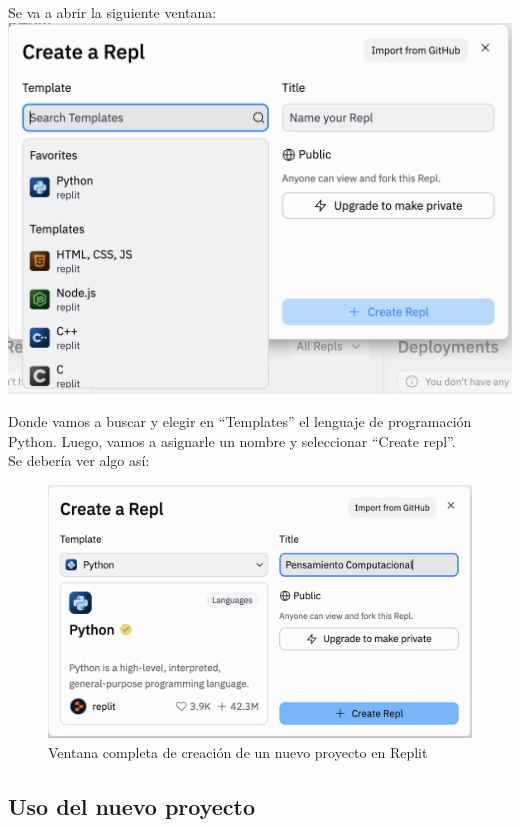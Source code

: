\documentclass[
  letterpaper,
  DIV=11,
  numbers=noendperiod]{scrreprt}
\begin{document}
Se va a abrir la siguiente ventana:
\includegraphics{./imgs/unidad_1/replit_create_repl2.png}

Donde vamos a buscar y elegir en ``Templates'' el lenguaje de
programación Python. Luego, vamos a asignarle un nombre y seleccionar
``Create repl''.\\
Se debería ver algo así:

\begin{figure}

{\centering \includegraphics{./imgs/unidad_1/replit_create_repl3.png}

}

\caption{Ventana completa de creación de un nuevo proyecto en Replit}

\end{figure}

\hypertarget{uso-del-nuevo-proyecto}{%
\subsection{Uso del nuevo proyecto}\label{uso-del-nuevo-proyecto}}
\end{document}

